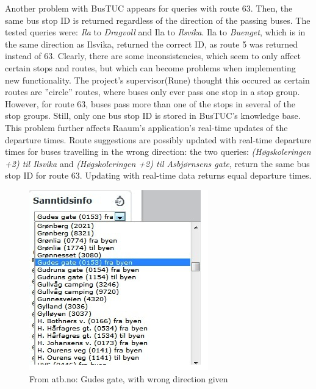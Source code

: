 Another problem with BusTUC appears for queries with route 63. Then, the same bus stop ID is returned regardless of the direction of the passing buses. The tested queries were: \emph{Ila} to \emph{Dragvoll} and Ila to \emph{Ilsvika}. Ila to \emph{Buenget}, which is in the same direction as Ilsvika, returned the correct ID, as route 5 was returned instead of 63. Clearly, there are some inconsistencies, which seem to only affect certain stops and routes, but which can become problems when implementing new functionality. The project's supervisor(Rune) thought this occured as certain routes are ''circle'' routes, where buses only ever pass one stop in a stop group. However, for route 63, buses pass more than one of the stops in several of the stop groups. Still, only one bus stop ID is stored in BusTUC's knowledge base. This problem further affects Raaum's application's real-time updates of the departure times. Route suggestions are possibly updated with real-time departure times for buses travelling in the wrong direction: the two queries: \emph{(H\o gskoleringen +2) til Ilsvika} and \emph{(H\o gskoleringen +2) til Asbj\o rnsens gate}, return the same bus stop ID for route 63. Updating with real-time data returns equal departure times.

\vspace{10pt}
\begin{figure}[h]
  \begin{center}
    \includegraphics[scale=0.90]{TestingTheApplication/atb2.png}
  \end{center}
\label{fig:gudes}
  \caption{From atb.no: Gudes gate, with wrong direction given}
\label{fig:gudes}
  \end{figure}



